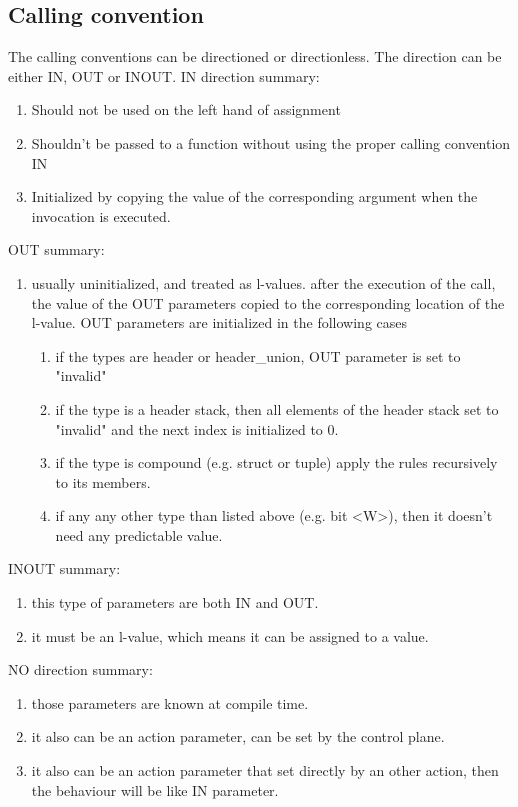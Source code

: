 \documentclass[UTF8]{article}
\begin{document}
\subsection{Calling convention}   
The calling conventions can be directioned or directionless. The direction can be either IN, OUT or INOUT. 
IN direction summary:
\begin{enumerate}
    \setlength{\itemsep}{1pt}
    \setlength{\parskip}{0pt}
    \setlength{\parsep}{0pt}
\item Should not be used on the left hand of assignment
\item Shouldn't be passed to a function without using the proper calling convention IN
\item Initialized by copying the value of the corresponding argument when the invocation is executed.
\end{enumerate}
OUT summary:
\begin{enumerate}
    \setlength{\itemsep}{1pt}
    \setlength{\parskip}{0pt}
    \setlength{\parsep}{0pt}
\item usually uninitialized, and treated as l-values. after the execution of the call, the value of the OUT parameters copied to the corresponding location of the l-value. OUT parameters are initialized in the following cases
\begin{enumerate}[label=(\alph*)]
\item if the types are header or header\_union, OUT parameter is set to "invalid"
\item if the type is a header stack, then all elements of the header stack set to "invalid" and the next index is initialized to 0.
\item if the type is compound (e.g. struct or tuple) apply the rules recursively to its members.
\item if any any other type than listed above (e.g. bit <W>), then it doesn't need any predictable value.
\end{enumerate}
\end{enumerate}

INOUT summary:
\begin{enumerate}
    \setlength{\itemsep}{1pt}
    \setlength{\parskip}{0pt}
    \setlength{\parsep}{0pt}
\item this type of parameters are both IN and OUT.
\item it must be an l-value, which means it can be assigned to a value.
\end{enumerate}
NO direction summary:
\begin{enumerate}
    \setlength{\itemsep}{1pt}
    \setlength{\parskip}{0pt}
    \setlength{\parsep}{0pt}
\item those parameters are known at compile time.
\item it also can be an action parameter, can be set by the control plane.
\item it also can be an action parameter that set directly by an other action, then the behaviour will be like IN parameter.
\end{enumerate}
\end{document}
